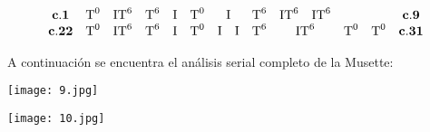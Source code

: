 		\[\begin{array}{*{12}c}
			\mathbf{c}.\mathbf{1}&\text{T}^0&\text{IT}^6&\text{T}^6&\text{I}&\text{T}^0&\text{I}&\text{T}^6&
				\begin{matrix}\text{IT}^6&\text{IT}^6\\
				\end{matrix}
			&&&\mathbf{c}.\mathbf{9}\\
			\mathbf{c}.\mathbf{22}&\text{T}^0&\text{IT}^6&\text{T}^6&\text{I}&\text{T}^0&
				\begin{matrix}
				\text{I}&\text{I}\\
				\end{matrix}
			&\text{T}^6&\text{IT}^6&\text{T}^0&\text{T}^0&\mathbf{c}.\mathbf{31}\\\end{array}\]
		
		A continuaci\'on
		se encuentra el an\'alisis serial completo de la Musette:
		
		\texttt{[image: 9.jpg]}
		
		\texttt{[image: 10.jpg]}
